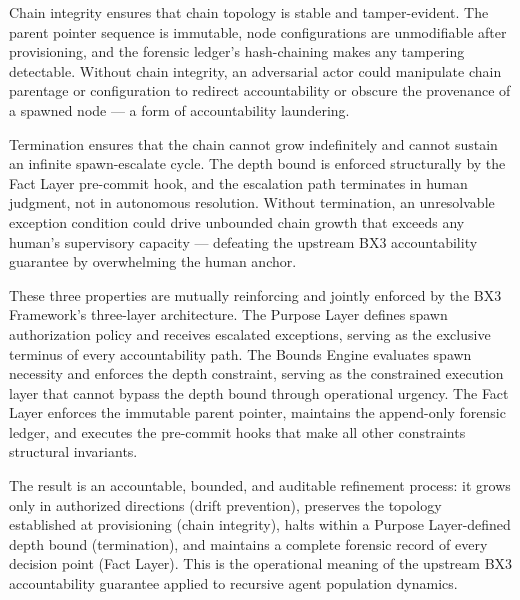 Chain integrity ensures that chain topology is stable and tamper-evident. The parent pointer sequence is immutable, node configurations are unmodifiable after provisioning, and the forensic ledger's hash-chaining makes any tampering detectable. Without chain integrity, an adversarial actor could manipulate chain parentage or configuration to redirect accountability or obscure the provenance of a spawned node — a form of accountability laundering.

Termination ensures that the chain cannot grow indefinitely and cannot sustain an infinite spawn-escalate cycle. The depth bound is enforced structurally by the Fact Layer pre-commit hook, and the escalation path terminates in human judgment, not in autonomous resolution. Without termination, an unresolvable exception condition could drive unbounded chain growth that exceeds any human's supervisory capacity — defeating the upstream BX3 accountability guarantee by overwhelming the human anchor.

These three properties are mutually reinforcing and jointly enforced by the BX3 Framework's three-layer architecture. The Purpose Layer defines spawn authorization policy and receives escalated exceptions, serving as the exclusive terminus of every accountability path. The Bounds Engine evaluates spawn necessity and enforces the depth constraint, serving as the constrained execution layer that cannot bypass the depth bound through operational urgency. The Fact Layer enforces the immutable parent pointer, maintains the append-only forensic ledger, and executes the pre-commit hooks that make all other constraints structural invariants.

The result is an accountable, bounded, and auditable refinement process: it grows only in authorized directions (drift prevention), preserves the topology established at provisioning (chain integrity), halts within a Purpose Layer-defined depth bound (termination), and maintains a complete forensic record of every decision point (Fact Layer). This is the operational meaning of the upstream BX3 accountability guarantee applied to recursive agent population dynamics.
